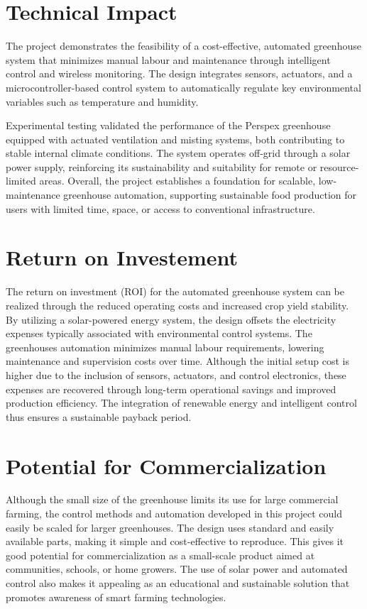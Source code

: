 \section{Technical Impact}

The project demonstrates the feasibility of a cost-effective, automated greenhouse system that minimizes manual labour and maintenance through intelligent control and wireless monitoring. The design integrates sensors, actuators, and a microcontroller-based control system to automatically regulate key environmental variables such as temperature and humidity.

Experimental testing validated the performance of the Perspex greenhouse equipped with actuated ventilation and misting systems, both contributing to stable internal climate conditions. The system operates off-grid through a solar power supply, reinforcing its sustainability and suitability for remote or resource-limited areas. Overall, the project establishes a foundation for scalable, low-maintenance greenhouse automation, supporting sustainable food production for users with limited time, space, or access to conventional infrastructure.

\section{Return on Investement}

The return on investment (ROI) for the automated greenhouse system can be realized through the reduced operating costs and increased crop yield stability. By utilizing a solar-powered energy system, the design offsets the electricity expenses typically associated with environmental control systems. The greenhouses automation minimizes manual labour requirements, lowering maintenance and supervision costs over time. Although the initial setup cost is higher due to the inclusion of sensors, actuators, and control electronics, these expenses are recovered through long-term operational savings and improved production efficiency. The integration of renewable energy and intelligent control thus ensures a sustainable payback period.

\section{Potential for Commercialization}

Although the small size of the greenhouse limits its use for large commercial farming, the control methods and automation developed in this project could easily be scaled for larger greenhouses. The design uses standard and easily available parts, making it simple and cost-effective to reproduce. This gives it good potential for commercialization as a small-scale product aimed at communities, schools, or home growers. The use of solar power and automated control also makes it appealing as an educational and sustainable solution that promotes awareness of smart farming technologies.




